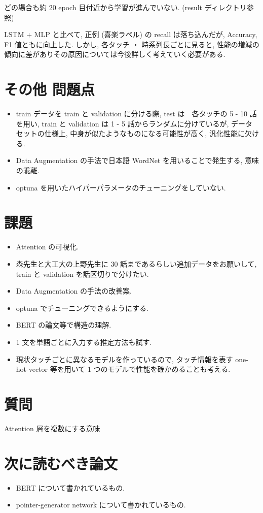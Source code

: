 \documentclass[twocolumn]{jarticle}     %
\begin{document}
どの場合も約 20 epoch 目付近から学習が進んでいない. (result ディレクトリ参照)

LSTM + MLP と比べて, 正例 (喜楽ラベル) の recall は落ち込んだが, Accuracy, F1 値ともに向上した. しかし, 各タッチ ・ 時系列長ごとに見ると, 性能の増減の傾向に差がありその原因については今後詳しく考えていく必要がある.


\section{その他 問題点}
\begin{itemize}
  \item train データを train と validation に分ける際, test は　各タッチの 5 - 10 話を用い, train と validation は 1 - 5 話からランダムに分けているが, データセットの仕様上, 中身が似たようなものになる可能性が高く, 汎化性能に欠ける.
  \item Data Augmentation の手法で日本語 WordNet を用いることで発生する, 意味の乖離.
  \item optuna を用いたハイパーパラメータのチューニングをしていない.
\end{itemize}

\section{課題}
\begin{itemize}
  \item Attention の可視化.
  \item 森先生と大工大の上野先生に 30 話まであるらしい追加データをお願いして, train と validation を話区切りで分けたい.
  \item Data Augmentation の手法の改善案.
  \item optuna でチューニングできるようにする.
  \item BERT の論文等で構造の理解.
  \item 1 文を単語ごとに入力する推定方法も試す.
  \item 現状タッチごとに異なるモデルを作っているので, タッチ情報を表す one-hot-vector 等を用いて 1 つのモデルで性能を確かめることも考える.
\end{itemize}

\section{質問}
Attention 層を複数にする意味
\section{次に読むべき論文}
\begin{itemize}
  \item BERT について書かれているもの.
  \item pointer-generator network について書かれているもの.
\end{itemize}




\end{document}
